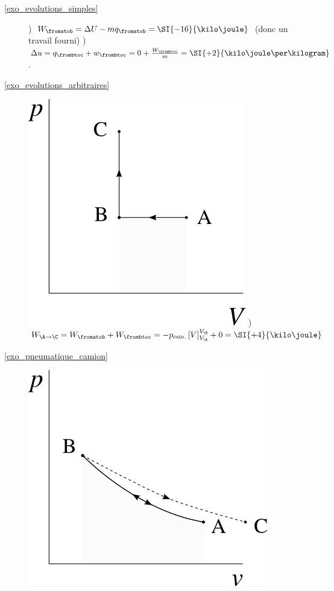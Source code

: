 \begin{description}
	\item [\ref{exo_evolutions_simples}]
					) $W_\fromatob = \Delta U - m q_\fromatob = \SI{-16}{\kilo\joule}$ (donc un travail fourni)
					) $\Delta u = q_\frombtoc + w_\frombtoc =  0 + \frac{W_\frombtoc}{m} = \SI{+2}{\kilo\joule\per\kilogram}$.
	\item [\ref{exo_evolutions_arbitraires}]
					\includegraphics[width=\solutiondiagramwidth]{images/exo_sol_pv_1.png}
					) $W_{\A\to\C} = W_\fromatob + W_\frombtoc = -p_{\text{cste.}} \left[V\right]_{V_\A}^{V_\B } + 0 = \SI{+4}{\kilo\joule}$
	\item [\ref{exo_pneumatique_camion}]
					\includegraphics[width=\solutiondiagramwidth]{images/exo_sol_pv_camion.png}

\end{description}

